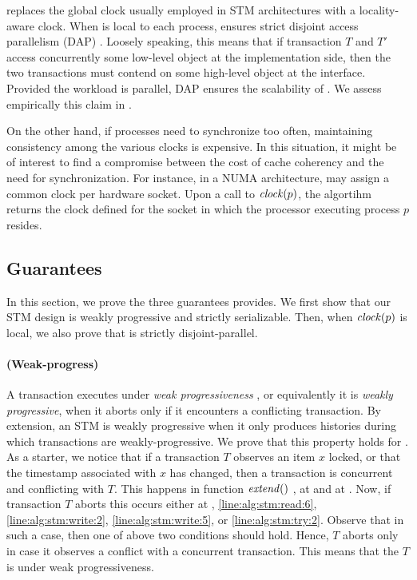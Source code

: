  replaces the global clock usually employed in STM architectures with a locality-aware clock.
When  is local to each process,  ensures strict disjoint access parallelism (DAP) \cite{Attiya2015}.
Loosely speaking, this means that if transaction $T$ and $T'$ access concurrently 
some low-level object at the implementation side, then the two transactions must contend on some high-level object at the interface.
Provided the workload is parallel, DAP ensures the scalability of .
We assess empirically this claim in .

On the other hand, if processes need to synchronize too often, maintaining consistency among the various clocks is expensive.
In this situation, it might be of interest to find a compromise between the cost of cache coherency and the need for synchronization.
For instance, in a NUMA architecture,  may assign a common clock per hardware socket.
Upon a call to $\clockOf{p}$, the algortihm returns the clock defined for the socket in which the processor executing process $p$ resides.

\subsection{Guarantees}

In this section, we prove the three guarantees  provides.
We first show that our STM design is weakly progressive and strictly serializable.
Then, when $\clockOf{p}$ is local, we also prove that  is strictly disjoint-parallel.

\paragraph{(Weak-progress)}
A transaction executes under \emph{weak progressiveness} \cite{Guerraoui:2009}, or equivalently it is \emph{weakly progressive}, when it aborts only if it encounters a conflicting transaction.
By extension, an STM is weakly progressive when it only produces histories during which transactions are weakly-progressive.
We prove that this property holds for .
As a starter, we notice that if a transaction $T$ observes an item $x$ locked, or that the timestamp associated with $x$ has changed, then a transaction is concurrent and conflicting with $T$.
This happens in function $\stmExtend{}$ , at  and at .
Now, if transaction $T$ aborts this occurs either at , \ref{line:alg:stm:read:6}, \ref{line:alg:stm:write:2}, \ref{line:alg:stm:write:5}, or \ref{line:alg:stm:try:2}.
Observe that in such a case, then one of above two conditions should hold.
Hence, $T$ aborts only in case it observes a conflict with a concurrent transaction.
This means that the $T$ is under weak progressiveness.

